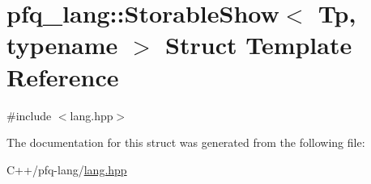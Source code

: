 \hypertarget{structpfq__lang_1_1StorableShow}{\section{pfq\+\_\+lang\+:\+:Storable\+Show$<$ Tp, typename $>$ Struct Template Reference}
\label{structpfq__lang_1_1StorableShow}
}


{\ttfamily \#include $<$lang.\+hpp$>$}



The documentation for this struct was generated from the following file\+:\begin{DoxyCompactItemize}
\item 
C++/pfq-\/lang/\hyperlink{lang_8hpp}{lang.\+hpp}\end{DoxyCompactItemize}
